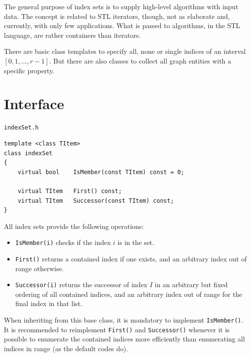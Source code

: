 \documentclass[a4paper,11pt,twoside]{book}
\begin{document}
\begin{multicols}{2}
The general purpose of index sets is to supply high-level algorithms with input
data. The concept is related to STL iterators, though, not as elaborate and,
currently, with only few applications. What is passed to algorithms, in the STL
language, are rather containers than iterators.

There are basic class templates to specify all, none or single indices of an
interval $[0,1,\dots,r-1]$. But there are also classes to collect all graph
entities with a specific property.


\section{Interface}
\myinclude\verb/indexSet.h/
\begin{mymethods}
\begin{verbatim}
template <class TItem>
class indexSet
{
    virtual bool    IsMember(const TItem) const = 0;

    virtual TItem   First() const;
    virtual TItem   Successor(const TItem) const;
}
\end{verbatim}
\end{mymethods}
All index sets provide the following operations:
\begin{itemize}
\item \verb/IsMember(i)/ checks if the index $i$ is in the set.
\item \verb/First()/ returns a contained index if one exists, and an arbitrary
    index out of range otherwise.
\item \verb/Successor(i)/ returns the successor of index $I$ in an arbitrary but
fixed ordering of all contained indices, and an arbitrary index out of range
for the final index in that list.
\end{itemize}
When inheriting from this base class, it is mandatory to implement
\verb/IsMember()/. It is recommended to reimplement \verb/First()/ and
\verb/Successor()/ whenever it is possible to enumerate the contained indices
more efficiently than enumerating all indices in range (as the default codes do).



\end{multicols}
\end{document}
